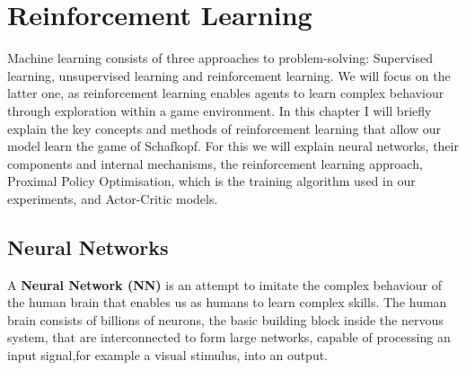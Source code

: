 \chapter{Reinforcement Learning}
Machine learning consists of three approaches to problem-solving: Supervised learning, unsupervised learning and
reinforcement learning.
We will focus on the latter one, as reinforcement learning enables agents to learn complex behaviour through
exploration within a game environment.
In this chapter I will briefly explain the key concepts and methods of reinforcement learning that allow our model
learn the game of Schafkopf.
For this we will explain neural networks, their components and internal mechanisms, the reinforcement learning approach,
Proximal Policy Optimisation, which is the training algorithm used in our experiments, and Actor-Critic models.

\section{Neural Networks}
A \textbf{Neural Network (NN)} is an attempt to imitate the complex behaviour of the human brain that
enables us as humans to learn complex skills.
The human brain consists of billions of neurons, the basic building block inside the nervous system, that are
interconnected to form large networks, capable of processing an input signal,for example a visual stimulus, into an
output.\\

